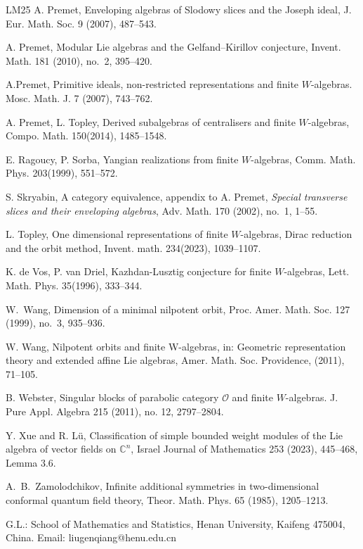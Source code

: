 \documentclass[12pt,a4paper]{amsart}
\numberwithin{equation}{section}
\theoremstyle{definition}
\theoremstyle{remark}
\begin{document}
\begin{thebibliography}{LM25}
 A. Premet, Enveloping algebras of Slodowy slices and the Joseph ideal, J. Eur. Math. Soc.
9 (2007), 487--543.


 A. Premet,
Modular Lie algebras and the Gelfand--Kirillov conjecture,
Invent. Math. 181 (2010), no.~2, 395--420.

 A.Premet, Primitive ideals, non-restricted representations and finite $W$-algebras. Mosc. Math. J. 7 (2007), 743--762.
%


 A. Premet, L. Topley, Derived subalgebras of centralisers and finite $W$-algebras, Compo. Math.  150(2014), 1485--1548.


 E. Ragoucy, P. Sorba, Yangian realizations from finite $W$-algebras, Comm. Math. Phys. 203(1999),
551--572.



 S. Skryabin,
A category equivalence, appendix to A. Premet,
\emph{Special transverse slices and their enveloping algebras},
Adv. Math. 170 (2002), no.~1, 1--55.

 L. Topley, One dimensional representations of finite $W$-algebras, Dirac reduction and the orbit method, Invent. math. 234(2023), 1039--1107.

  K. de Vos, P. van Driel, Kazhdan-Lusztig conjecture for finite $W$-algebras, Lett. Math. Phys. 35(1996),
333--344.

W.~Wang,
Dimension of a minimal nilpotent orbit,
Proc.  Amer. Math. Soc. 127 (1999), no.~3, 935--936.

     W. Wang, Nilpotent orbits and finite W-algebras, in: Geometric representation theory and extended affine Lie algebras, Amer. Math. Soc. Providence, (2011), 71--105.

  B. Webster, Singular blocks of parabolic category $\mathcal{O}$ and finite $W$-algebras. J. Pure Appl. Algebra 215 (2011), no. 12, 2797--2804.


  Y. Xue and R. L{\"u}, Classification of simple bounded weight modules of the Lie algebra of vector fields on \(\mathbb C^n\), Israel Journal of Mathematics 253 (2023), 445--468, Lemma 3.6.

     A.~B.~Zamolodchikov, Infinite additional symmetries in two-dimensional conformal quantum field theory, Theor. Math. Phys. 65 (1985), 1205--1213.

\end{thebibliography}

\vspace{4mm}

 \noindent G.L.: School of Mathematics and Statistics,
Henan University, Kaifeng 475004, China. Email: liugenqiang@henu.edu.cn


\vspace{0.2cm}
\end{document}
